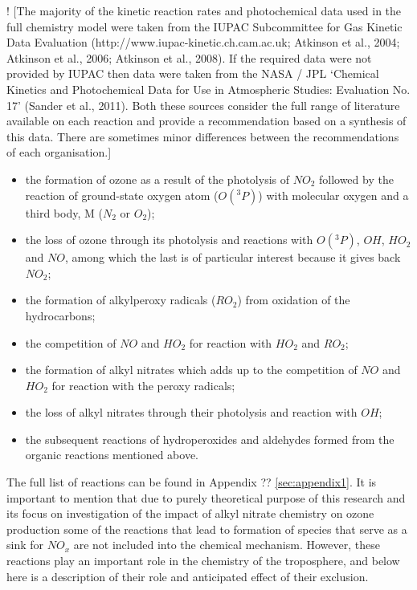 \documentclass[11pt,a4paper]{article}
\begin{document}
! \citep{Newland2013}
[The majority of the kinetic reaction rates and photochemical data used in the full chemistry model were taken from the IUPAC Subcommittee for Gas Kinetic Data Evaluation (http://www.iupac-kinetic.ch.cam.ac.uk; Atkinson et al., 2004; Atkinson et al., 2006; Atkinson et al., 2008). If the required data were not provided by IUPAC then data were taken from the NASA / JPL ‘Chemical Kinetics and Photochemical Data for Use in Atmospheric Studies: Evaluation No. 17’ (Sander et al., 2011). Both these sources consider the full range of literature available on each reaction and provide a recommendation based on a synthesis of this data. There are sometimes minor differences between the recommendations of each organisation.]

\begin{itemize}
\item the formation of ozone as a result of the photolysis of $NO_2$ followed by the reaction of ground-state oxygen atom ($O(^3P)$) with molecular oxygen and a third body, M ($N_2$ or $O_2$);
\item the loss of ozone through its photolysis and reactions with $O(^3P)$, $OH$, $HO_2$ and $NO$, among which the last is of particular interest because it gives back $NO_2$;
\item the formation of alkylperoxy radicals ($RO_2$) from oxidation of the hydrocarbons;
\item the competition of $NO$ and $HO_2$ for reaction with $HO_2$ and $RO_2$;
\item the formation of alkyl nitrates which adds up to the competition of $NO$ and $HO_2$ for reaction with the peroxy radicals;
\item the loss of alkyl nitrates through their photolysis and reaction with $OH$;
\item the subsequent reactions of hydroperoxides and aldehydes formed from the organic reactions mentioned above.
\end{itemize}
The full list of reactions can be found in Appendix ?? \ref{sec:appendix1}. It is important to mention that due to purely theoretical purpose of this research and its focus on investigation of the impact of alkyl nitrate chemistry on ozone production some of the reactions that lead to formation of species that serve as a sink for $NO_x$ are not included into the chemical mechanism. However, these reactions play an important role in the chemistry of the troposphere, and below here is a description of their role and anticipated effect of their exclusion.
\end{document}
